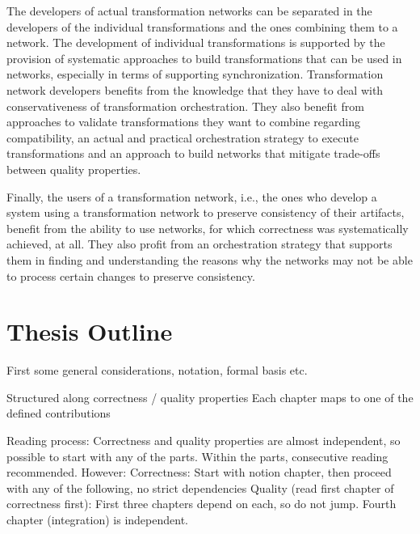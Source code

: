 The developers of actual transformation networks can be separated in the developers of the individual transformations and the ones combining them to a network.
The development of individual transformations is supported by the provision of systematic approaches to build transformations that can be used in networks, especially in terms of supporting synchronization.
Transformation network developers benefits from the knowledge that they have to deal with conservativeness of transformation orchestration.
They also benefit from approaches to validate transformations they want to combine regarding compatibility, an actual and practical orchestration strategy to execute transformations and an approach to build networks that mitigate trade-offs between quality properties.

Finally, the users of a transformation network, i.e., the ones who develop a system using a transformation network to preserve consistency of their artifacts, benefit from the ability to use networks, for which correctness was systematically achieved, at all.
They also profit from an orchestration strategy that supports them in finding and understanding the reasons why the networks may not be able to process certain changes to preserve consistency.



\section{Thesis Outline}

First some general considerations, notation, formal basis etc.

Structured along correctness / quality properties
Each chapter maps to one of the defined contributions

Reading process: Correctness and quality properties are almost independent, so possible to start with any of the parts. Within the parts, consecutive reading recommended.
However:
Correctness: Start with notion chapter, then proceed with any of the following, no strict dependencies
Quality (read first chapter of correctness first): First three chapters depend on each, so do not jump. Fourth chapter (integration) is independent.






